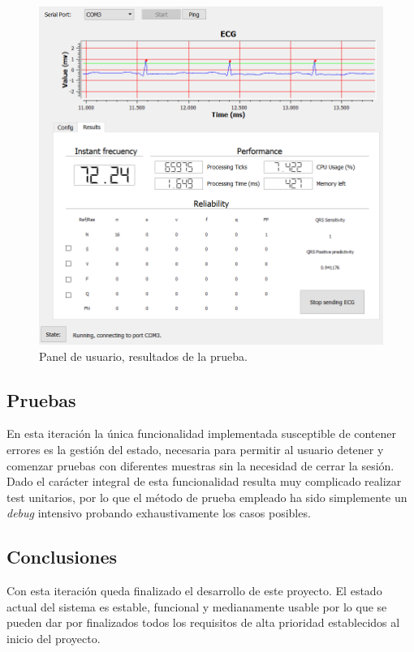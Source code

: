         \begin{figure}[H]
            \centering
                    \includegraphics[width = \linewidth]{figuras/Results.PNG}
            \caption{Panel de usuario, resultados de la prueba.}
            \label{fig:EndResults}
        \end{figure}
        
    \clearpage
    \subsection{Pruebas}
    
    En esta iteración la única funcionalidad implementada susceptible de contener errores es la gestión del estado, necesaria para permitir al usuario detener y comenzar pruebas con diferentes muestras sin la necesidad de cerrar la sesión. Dado el carácter integral de esta funcionalidad resulta muy complicado realizar test unitarios, por lo que el método de prueba empleado ha sido simplemente un \textit{debug} intensivo probando exhaustivamente los casos posibles.
    
    \subsection{Conclusiones}
    
    Con esta iteración queda finalizado el desarrollo de este proyecto. El estado actual del sistema es estable, funcional y medianamente usable por lo que se pueden dar por finalizados todos los requisitos de alta prioridad establecidos al inicio del proyecto.
    
